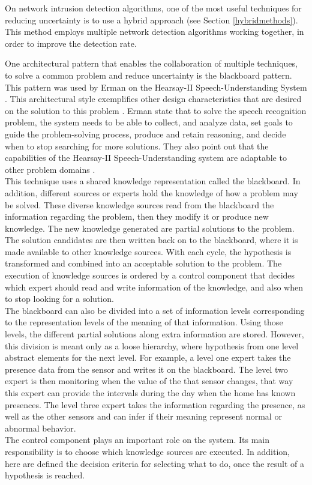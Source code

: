 On network intrusion detection algorithms, one of the most useful techniques for reducing uncertainty is to use a hybrid approach (see Section \ref{hybridmethods}). This method employs multiple network detection algorithms working together, in order to improve the detection rate. 

One architectural pattern that enables the collaboration of multiple techniques, to solve a common problem and reduce uncertainty is the blackboard pattern. This pattern was used by Erman \etAl on the Hearsay-II Speech-Understanding System \cite{Erman:1980:HSS:356810.356816}. This architectural style exemplifies other design characteristics that are desired on the solution to this problem \cite{Bruegge2004}. Erman \etAl state that to solve the speech recognition problem, the system needs to be able to collect, and analyze data, set goals to guide the problem-solving process, produce and retain reasoning, and decide when to stop searching for more solutions. They also point out that the capabilities of the Hearsay-II Speech-Understanding system are adaptable to other problem domains \cite{Erman:1980:HSS:356810.356816}.
\\
This technique uses a shared knowledge representation called the blackboard. In addition, different sources or experts hold the knowledge of how a problem may be solved. These diverse knowledge sources read from the blackboard the information regarding the problem, then they modify it or produce new knowledge. The new knowledge generated are partial solutions to the problem. The solution candidates are then written back on to the blackboard, where it is made available to other knowledge sources. With each cycle, the hypothesis is transformed and combined into an acceptable solution to the problem. The execution of knowledge sources is ordered by a control component that decides which expert should read and write information of the knowledge, and also when to stop looking for a solution. 
\\
The blackboard can also be divided into a set of information levels corresponding to the representation levels of the meaning of that information. Using those levels, the different partial solutions along extra information are stored. However, this division is meant only as a loose hierarchy, where hypothesis from one level abstract elements for the next level. For example, a level one expert takes the presence data from the sensor and writes it on the blackboard. The level two expert is then monitoring when the value of the that sensor changes, that way this expert can provide the intervals during the day when the home has known presences. The level three expert takes the information regarding the presence, as well as the other sensors and can infer if their meaning represent normal or abnormal behavior.
\\
The control component plays an important role on the system. Its main responsibility is to choose which knowledge sources are executed. In addition, here are defined the decision criteria for selecting what to do, once the result of a hypothesis is reached.


